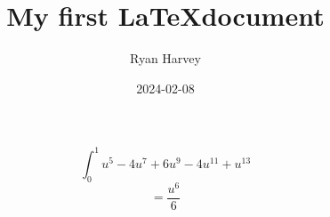 \documentclass{article}
\begin{document}
\title{My first \LaTeX document}
\author{Ryan Harvey}
\date{2024-02-08}
\maketitle
\newpage
$$\int_0^1u^5-4u^7+6u^9-4u^{11}+u^{13}$$
$$= \frac{u^6}{6}$$
\end{document}
